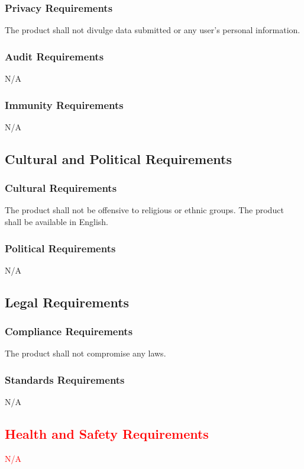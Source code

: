 \documentclass[12pt, titlepage]{article}
\begin{document}
\subsubsection{Privacy Requirements}
The product shall not divulge data submitted or any user’s personal information.


\subsubsection{Audit Requirements}
N/A

\subsubsection{Immunity Requirements}
N/A

\subsection{Cultural and Political Requirements}
\subsubsection*{Cultural Requirements}
The product shall not be offensive to religious or ethnic groups. The product shall be available in English.

\subsubsection{Political Requirements}
N/A

\subsection{Legal Requirements}
\subsubsection{Compliance Requirements}
The product shall not compromise any laws.


\subsubsection{Standards Requirements}
N/A

\subsection{\textcolor{red}{Health and Safety Requirements}}
\textcolor{red}{N/A}
\end{document}
